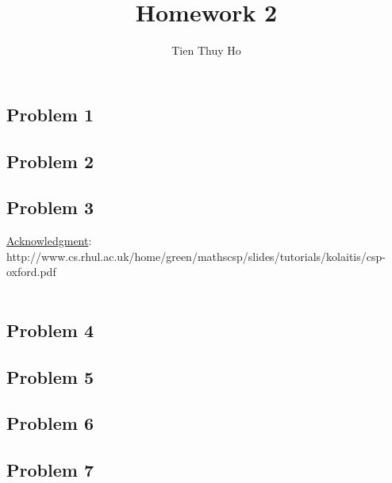 \documentclass[12 pt]{article}
\begin{document}
\title{Homework 2}
\author{Tien Thuy Ho}
\maketitle

\subsection*{Problem 1} 
\subsection*{Problem 2} 
\subsection*{Problem 3} 
\underline{Acknowledgment}: http://www.cs.rhul.ac.uk/home/green/mathscsp/slides/tutorials/kolaitis/csp-oxford.pdf \\ \\

\subsection*{Problem 4} 
\subsection*{Problem 5} 
\subsection*{Problem 6} 
\subsection*{Problem 7} 
\end{document}

